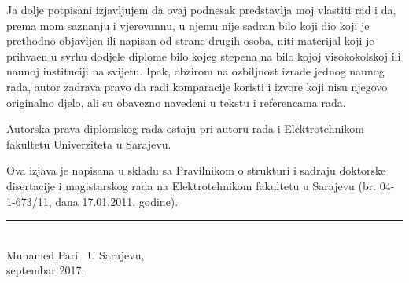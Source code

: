 Ja dolje potpisani izjavljujem da ovaj podnesak predstavlja moj vlastiti rad i da, prema mom
saznanju i vjerovannu, u njemu nije sadr\zh an bilo koji dio koji je prethodno objavljen ili napisan
od strane drugih osoba, niti materijal koji je prihva\cj en u svrhu dodjele diplome bilo kojeg
stepena na bilo kojoj visoko\sh kolskoj ili nau\ch noj instituciji na svijetu. Ipak, obzirom na ozbiljnost
izrade jednog nau\ch nog rada, autor zadr\zh ava pravo da radi komparacije koristi i izvore
koji nisu njegovo originalno djelo, ali su obavezno navedeni u tekstu i referencama rada.

Autorska prava diplomskog rada ostaju pri autoru rada i Elektrotehni\ch kom fakultetu Univerziteta
u Sarajevu.

Ova izjava je napisana u skladu sa Pravilnikom o strukturi i sadr\zh aju doktorske disertacije i 
magistarskog rada na Elektrotehni\ch kom fakultetu u Sarajevu (br. 04-1-673/11, dana 17.01.2011.
godine).
\vfill
\begin{center}
\noindent\rule{8cm}{0.4pt}\\
Muhamed Pari\cj\ 
\vfill
U Sarajevu,\\
septembar 2017.
\end{center}
